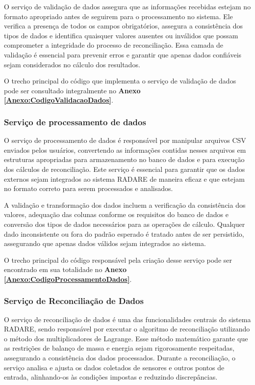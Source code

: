 O serviço de validação de dados assegura que as informações recebidas estejam no formato apropriado antes de seguirem para o processamento no sistema. Ele verifica a presença de todos os campos obrigatórios, assegura a consistência dos tipos de dados e identifica quaisquer valores ausentes ou inválidos que possam comprometer a integridade do processo de reconciliação. Essa camada de validação é essencial para prevenir erros e garantir que apenas dados confiáveis sejam considerados no cálculo dos resultados.

O trecho principal do código que implementa o serviço de validação de dados pode ser consultado integralmente no \textbf{Anexo \ref{Anexo:CodigoValidacaoDados}}.

\subsubsection{Serviço de processamento de dados}

O serviço de processamento de dados é responsável por manipular arquivos CSV enviados pelos usuários, convertendo as informações contidas nesses arquivos em estruturas apropriadas para armazenamento no banco de dados e para execução dos cálculos de reconciliação. Este serviço é essencial para garantir que os dados externos sejam integrados ao sistema RADARE de maneira eficaz e que estejam no formato correto para serem processados e analisados.

A validação e transformação dos dados incluem a verificação da consistência dos valores, adequação das colunas conforme os requisitos do banco de dados e conversão dos tipos de dados necessários para as operações de cálculo. Qualquer dado inconsistente ou fora do padrão esperado é tratado antes de ser persistido, assegurando que apenas dados válidos sejam integrados ao sistema.

O trecho principal do código responsável pela criação desse serviço pode ser encontrado em sua totalidade no \textbf{Anexo \ref{Anexo:CodigoProcessamentoDados}}.

\subsubsection{Serviço de Reconciliação de Dados}

O serviço de reconciliação de dados é uma das funcionalidades centrais do sistema RADARE, sendo responsável por executar o algoritmo de reconciliação utilizando o método dos multiplicadores de Lagrange. Esse método matemático garante que as restrições de balanço de massa e energia sejam rigorosamente respeitadas, assegurando a consistência dos dados processados. Durante a reconciliação, o serviço analisa e ajusta os dados coletados de sensores e outros pontos de entrada, alinhando-os às condições impostas e reduzindo discrepâncias.

